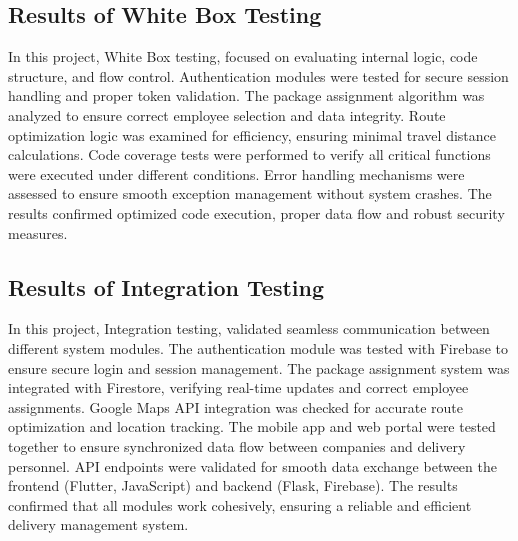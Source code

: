 \subsection{ Results of White Box Testing}
In this project, White Box testing, focused on evaluating internal logic, code structure, and flow control. Authentication modules were tested for secure session handling and proper token validation. The package assignment algorithm was analyzed to ensure correct employee selection and data integrity. Route optimization logic was examined for efficiency, ensuring minimal travel distance calculations. Code coverage tests were performed to verify all critical functions were executed under different conditions. Error handling mechanisms were assessed to ensure smooth exception management without system crashes. The results confirmed optimized code execution, proper data flow and robust security measures.
\subsection{Results of Integration Testing}
In this project, Integration testing, validated seamless communication between different system modules. The authentication module was tested with Firebase to ensure secure login and session management. The package assignment system was integrated with Firestore, verifying real-time updates and correct employee assignments. Google Maps API integration was checked for accurate route optimization and location tracking. The mobile app and web portal were tested together to ensure synchronized data flow between companies and delivery personnel. API endpoints were validated for smooth data exchange between the frontend (Flutter, JavaScript) and backend (Flask, Firebase). The results confirmed that all modules work cohesively, ensuring a reliable and efficient delivery management system.
